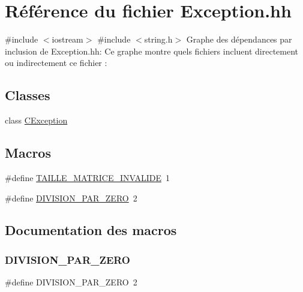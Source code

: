 \hypertarget{Exception_8hh}{}\section{Référence du fichier Exception.\+hh}
\label{Exception_8hh}
{\ttfamily \#include $<$iostream$>$}\newline
{\ttfamily \#include $<$string.\+h$>$}\newline
Graphe des dépendances par inclusion de Exception.\+hh\+:
Ce graphe montre quels fichiers incluent directement ou indirectement ce fichier \+:
\subsection*{Classes}
\begin{DoxyCompactItemize}
\item 
class \hyperlink{classCException}{C\+Exception}
\end{DoxyCompactItemize}
\subsection*{Macros}
\begin{DoxyCompactItemize}
\item 
\#define \hyperlink{Exception_8hh_a904803f7b2fb4f1a57387e87d87f51ac}{T\+A\+I\+L\+L\+E\+\_\+\+M\+A\+T\+R\+I\+C\+E\+\_\+\+I\+N\+V\+A\+L\+I\+DE}~1
\item 
\#define \hyperlink{Exception_8hh_a9e8acf94fef30cd8cdf031065209d03a}{D\+I\+V\+I\+S\+I\+O\+N\+\_\+\+P\+A\+R\+\_\+\+Z\+E\+RO}~2
\end{DoxyCompactItemize}


\subsection{Documentation des macros}
\mbox{\label{Exception_8hh_a9e8acf94fef30cd8cdf031065209d03a}} 
\subsubsection{\texorpdfstring{D\+I\+V\+I\+S\+I\+O\+N\+\_\+\+P\+A\+R\+\_\+\+Z\+E\+RO}{DIVISION\_PAR\_ZERO}}
{\footnotesize\ttfamily \#define D\+I\+V\+I\+S\+I\+O\+N\+\_\+\+P\+A\+R\+\_\+\+Z\+E\+RO~2}

